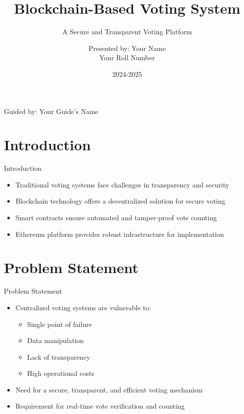 \documentclass{beamer}
\title{Blockchain-Based Voting System}
\subtitle{A Secure and Transparent Voting Platform}
\author{Presented by: Your Name \\ Your Roll Number}
\institute{Department of Computer Science and Engineering\\
Your University Name}
\date{2024-2025}
\begin{document}
\begin{frame}
  \titlepage
  \begin{center}
    \vspace{0.5cm}
    \small{Guided by: Your Guide's Name}
  \end{center}
\end{frame}

\section{Introduction}
\begin{frame}{Introduction}
  \begin{itemize}
    \item Traditional voting systems face challenges in transparency and security
    \item Blockchain technology offers a decentralized solution for secure voting
    \item Smart contracts ensure automated and tamper-proof vote counting
    \item Ethereum platform provides robust infrastructure for implementation
  \end{itemize}
\end{frame}

\section{Problem Statement}
\begin{frame}{Problem Statement}
  \begin{itemize}
    \item Centralized voting systems are vulnerable to:
      \begin{itemize}
        \item Single point of failure
        \item Data manipulation
        \item Lack of transparency
        \item High operational costs
      \end{itemize}
    \item Need for a secure, transparent, and efficient voting mechanism
    \item Requirement for real-time vote verification and counting
  \end{itemize}
\end{frame}
\end{document}
